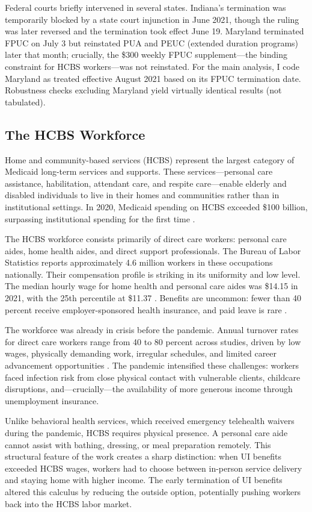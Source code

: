 \documentclass[12pt]{article}
\begin{document}
Federal courts briefly intervened in several states. Indiana's termination was temporarily blocked by a state court injunction in June 2021, though the ruling was later reversed and the termination took effect June 19. Maryland terminated FPUC on July 3 but reinstated PUA and PEUC (extended duration programs) later that month; crucially, the \$300 weekly FPUC supplement---the binding constraint for HCBS workers---was not reinstated. For the main analysis, I code Maryland as treated effective August 2021 based on its FPUC termination date. Robustness checks excluding Maryland yield virtually identical results (not tabulated).

\subsection{The HCBS Workforce}

Home and community-based services (HCBS) represent the largest category of Medicaid long-term services and supports. These services---personal care assistance, habilitation, attendant care, and respite care---enable elderly and disabled individuals to live in their homes and communities rather than in institutional settings. In 2020, Medicaid spending on HCBS exceeded \$100 billion, surpassing institutional spending for the first time \citep{macpac2022}.

The HCBS workforce consists primarily of direct care workers: personal care aides, home health aides, and direct support professionals. The Bureau of Labor Statistics reports approximately 4.6 million workers in these occupations nationally. Their compensation profile is striking in its uniformity and low level. The median hourly wage for home health and personal care aides was \$14.15 in 2021, with the 25th percentile at \$11.37 \citep{bls2022}. Benefits are uncommon: fewer than 40 percent receive employer-sponsored health insurance, and paid leave is rare \citep{phi2021}.

The workforce was already in crisis before the pandemic. Annual turnover rates for direct care workers range from 40 to 80 percent across studies, driven by low wages, physically demanding work, irregular schedules, and limited career advancement opportunities \citep{scales2020}. The pandemic intensified these challenges: workers faced infection risk from close physical contact with vulnerable clients, childcare disruptions, and---crucially---the availability of more generous income through unemployment insurance.

Unlike behavioral health services, which received emergency telehealth waivers during the pandemic, HCBS requires physical presence. A personal care aide cannot assist with bathing, dressing, or meal preparation remotely. This structural feature of the work creates a sharp distinction: when UI benefits exceeded HCBS wages, workers had to choose between in-person service delivery and staying home with higher income. The early termination of UI benefits altered this calculus by reducing the outside option, potentially pushing workers back into the HCBS labor market.
\end{document}
